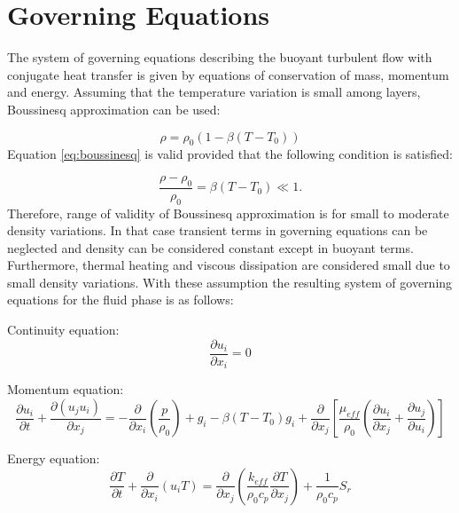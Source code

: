 \section*{Governing Equations}

The system of governing equations describing the buoyant turbulent
flow with conjugate heat transfer is given by equations of
conservation of mass, momentum and energy. Assuming that the
temperature variation is small among layers, Boussinesq approximation
can be used:

\begin{equation}\label{eq:boussinesq}
\rho = \rho_0(1 - \beta(T - T_0))
\end{equation}
Equation \ref{eq:boussinesq} is valid provided that the following
condition is satisfied:

\begin{equation}\label{eq:condition}
  \frac{\rho - \rho_0}{\rho_0} = \beta(T - T_0) \ll 1.
\end{equation}
Therefore, range of validity of Boussinesq approximation is for small
to moderate density variations. In that case transient terms in
governing equations can be neglected and density can be considered
constant except in buoyant terms. Furthermore, thermal heating and
viscous dissipation are considered small due to small density
variations. With these assumption the resulting system of governing
equations for the fluid phase is as follows:

Continuity equation:
\begin{equation}\label{eq:fluid-continuity}
  \frac{\partial u_i}{\partial x_i} = 0
\end{equation}

Momentum equation:
\begin{equation}\label{eq:fluid-momentum}
\frac{\partial u_i}{\partial t} +
  \frac{\partial(u_ju_i)}{\partial x_j} = 
    -\frac{\partial}{\partial x_i}
    \left( \frac{p}{\rho_0} \right) + g_i
  -\beta(T - T_0)g_{i} 
  + \frac{\partial}{\partial x_j}
  \left[\frac{\mu_{eff}}{\rho_0}
    \left(\frac{\partial u_i}{\partial x_j} + 
    \frac{\partial u_j}{\partial u_i}\right)\right]
\end{equation}

Energy equation:
\begin{equation}\label{eq:fluid-energy}
\frac{\partial T}{\partial t} +
\frac{\partial}{\partial x_i}(u_i T) = 
\frac{\partial}{\partial x_j}
\left(\frac{k_{eff}}{\rho_0 c_p}\frac{\partial T}{\partial x_j}\right) 
+ \frac{1}{\rho_0 c_p} S_r
\end{equation}

